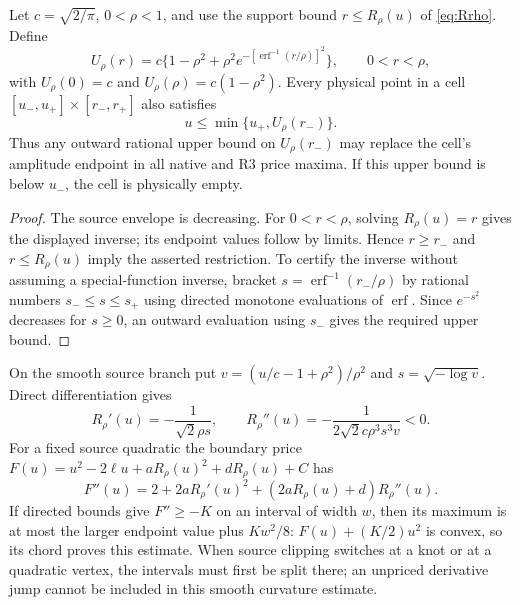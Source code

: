 \begin{lemma}
\label{lem:physical-source-clipping}
Let $c=\sqrt{2/\pi}$, $0<\rho<1$, and use the support bound
$r\le R_\rho(u)$ of \eqref{eq:Rrho}.  Define
\[
 U_\rho(r)=c\{1-\rho^2+\rho^2
  e^{-[\operatorname{erf}^{-1}(r/\rho)]^2}\},
 \qquad 0<r<\rho,
\]
with $U_\rho(0)=c$ and $U_\rho(\rho)=c(1-\rho^2)$.
Every physical point in a cell
$[u_-,u_+]\times[r_-,r_+]$ also satisfies
\[
 u\le\min\{u_+,U_\rho(r_-)\}.
\]
Thus any outward rational upper bound on $U_\rho(r_-)$ may replace
the cell's amplitude endpoint in all native and R3 price maxima.
If this upper bound is below $u_-$, the cell is physically empty.
\end{lemma}
\begin{proof}
The source envelope is decreasing.  For $0<r<\rho$, solving
$R_\rho(u)=r$ gives the displayed inverse; its endpoint values
follow by limits.  Hence $r\ge r_-$ and $r\le R_\rho(u)$ imply
the asserted restriction.  To certify the inverse without assuming
a special-function inverse, bracket
$s=\operatorname{erf}^{-1}(r_-/\rho)$ by rational numbers
$s_-\le s\le s_+$ using directed monotone evaluations of
$\operatorname{erf}$.  Since $e^{-s^2}$ decreases for $s\ge0$,
an outward evaluation using $s_-$ gives the required upper bound.
\end{proof}

On the smooth source branch put
$v=(u/c-1+\rho^2)/\rho^2$ and $s=\sqrt{-\log v}$.
Direct differentiation gives
\[
 R_\rho'(u)=-\frac1{\sqrt2\rho s},\qquad
 R_\rho''(u)=-\frac1{2\sqrt2c\rho^3s^3v}<0.
\]
For a fixed source quadratic the boundary price
$F(u)=u^2-2\ell u+aR_\rho(u)^2+dR_\rho(u)+C$ has
\[
 F''(u)=2+2aR_\rho'(u)^2+
                 (2aR_\rho(u)+d)R_\rho''(u).
\]
If directed bounds give $F''\ge-K$ on an interval of width $w$,
then its maximum is at most the larger endpoint value plus $Kw^2/8$:
$F(u)+(K/2)u^2$ is convex, so its chord proves this estimate.
When source clipping switches at a knot or at a quadratic vertex,
the intervals must first be split there; an unpriced derivative
jump cannot be included in this smooth curvature estimate.
